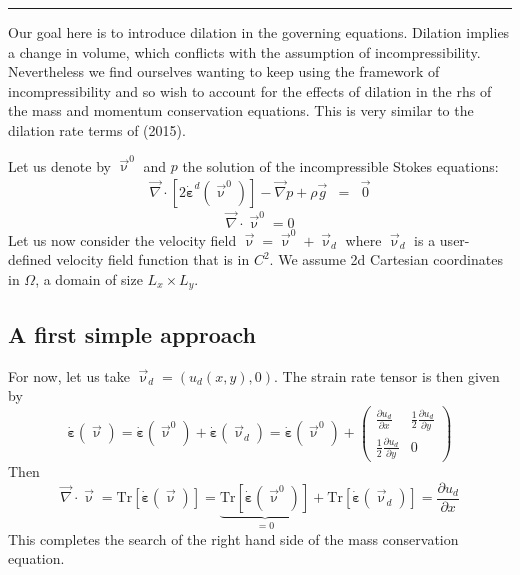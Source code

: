 \par\noindent\rule{\textwidth}{0.4pt}




Our goal here is to introduce dilation in the governing equations.
Dilation implies a change in volume, which conflicts with the assumption of incompressibility. 
Nevertheless we find ourselves wanting to keep using the framework of incompressibility and 
so wish to account for the effects of dilation in the rhs of the mass and momentum conservation
equations. This is very similar to the dilation rate terms of \textcite{chpe15} (2015).

Let us denote by $\vec{\upnu}^0$ and $p$ the solution of the 
incompressible Stokes equations:
\begin{eqnarray}
\vec\nabla \cdot [2  \dot{\bm \varepsilon}^d(\vec\upnu^0)  ]  
-\vec\nabla p + \rho \vec{g} &=& \vec{0} \label{eq:dil1}
\end{eqnarray}
\[
\vec\nabla \cdot \vec\upnu^0 = 0
\]
Let us now consider the velocity field $\vec{\upnu}=\vec{\upnu}^0+\vec{\upnu}_d$
where $\vec{\upnu}_d$ is a user-defined velocity field function that is in $C^2$. 
We assume 2d Cartesian coordinates in $\Omega$, a domain of size $L_x \times L_y$. 

\subsection*{A first simple approach}

For now, let us take $\vec{\upnu}_d=(u_d(x,y) ,0)$.
The strain rate tensor is then given by 
\[
\dot{\bm \varepsilon}(\vec\upnu)= \dot{\bm \varepsilon}(\vec\upnu^0)
+ \dot{\bm \varepsilon}(\vec\upnu_d)= 
\dot{\bm \varepsilon}(\vec\upnu^0) + 
\begin{pmatrix}
\frac{\partial u_d}{\partial x} & \frac12 \frac{\partial u_d}{\partial y}  \\
\frac12 \frac{\partial u_d}{\partial y}  & 0
\end{pmatrix}
\]
Then 
\[
\vec\nabla \cdot \vec\upnu 
= \text{Tr}[\dot{\bm \varepsilon}(\vec\upnu)]
= \underbrace{\text{Tr}[\dot{\bm \varepsilon}(\vec\upnu^0)]}_{=0}
+ \text{Tr}[\dot{\bm \varepsilon}(\vec\upnu_d)]
= \frac{\partial u_d}{\partial x}
\]
This completes the search of the right hand side of the mass conservation equation.

